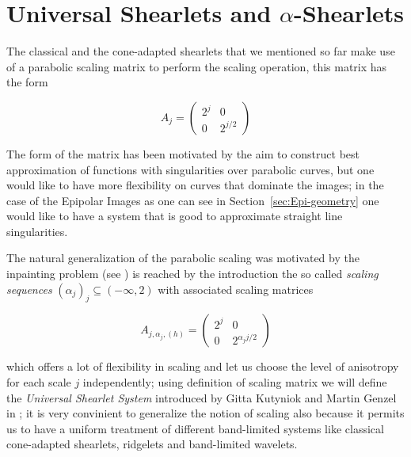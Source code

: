 \section{Universal Shearlets and $\alpha$-Shearlets}
\label{sec:AlphaShearlets}

The classical and the cone-adapted shearlets that we mentioned so far make use of a parabolic scaling matrix to perform the scaling operation, this matrix has the form 

\begin{equation}
\label{eq:parabolic_scaling}
A_j=\left(
\begin{matrix}
2^j & 0 \\
0 & 2^{j/2}
\end{matrix}
\right)
\end{equation}

The form of the matrix has been motivated by the aim to construct best approximation of functions with singularities over parabolic curves, but one would like to have more flexibility on curves that dominate the images; in the case of the Epipolar Images as one can see in Section~\ref{sec:Epi-geometry} one would like to have a system that is good to approximate straight line singularities. 

\bigskip

The natural generalization of the parabolic scaling was motivated by the inpainting problem (see \cite{Gitta-alpha}) is reached by the introduction the so called \textit{scaling sequences} $(\alpha_j)_j\subseteq (-\infty,2)$ with associated scaling matrices

\begin{equation}
\label{eq:alpha_scaling}
A_{j,\alpha_j,(h)}=\left(
\begin{matrix}
2^j & 0 \\
0 & 2^{\alpha_j j/2}
\end{matrix}
\right)
\end{equation}

which offers a lot of flexibility in scaling and let us choose the level of anisotropy for each scale $j$ independently; using definition of scaling matrix we will define the \textit{Universal Shearlet System} introduced by Gitta Kutyniok and Martin Genzel in \cite{Gitta-alpha}; it is very convinient to generalize the notion of scaling also because it permits us to have a uniform treatment of different band-limited systems like classical cone-adapted shearlets, ridgelets and band-limited wavelets. 

\bigskip

